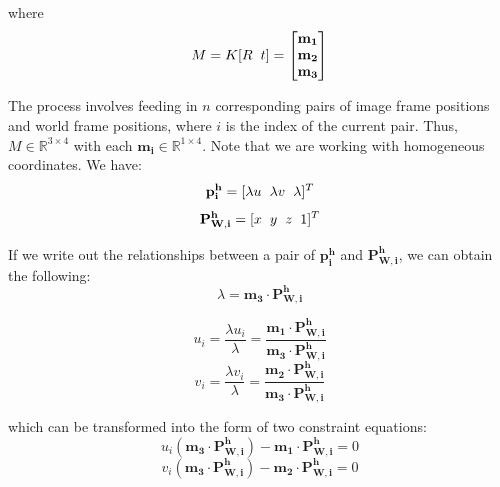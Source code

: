 \documentclass[]{article}
\begin{document}
where
\begin{equation}
    M = K [R \hspace{2mm} t]=
\begin{bmatrix}
    \mathbf{m_1} \\
    \mathbf{m_2} \\
    \mathbf{m_3}
\end{bmatrix}
\end{equation}

The process involves feeding in $n$ corresponding pairs of image frame positions and world frame positions, where $i$ is the index of the current pair. Thus, $M \in \mathbb{R}^{3 \times 4}$ with each $\mathbf{m_i} \in \mathbb{R}^{1 \times 4}$. Note that we are working with homogeneous coordinates. We have:
\begin{equation}
    \mathbf{p_i^h} = [\lambda u \hspace{2mm} \lambda v \hspace{2mm} \lambda]^T
\end{equation}
\begin{equation}
        \mathbf{P_{W,i}^{h}} = [x \hspace{2mm} y \hspace{2mm} z \hspace{2mm} 1]^T
\end{equation}

If we write out the relationships between a pair of $\mathbf{p_i^h}$ and $\mathbf{P_{W,i}^h}$, we can obtain the following:
\begin{equation}
    \lambda = \mathbf{m_3} \cdot \mathbf{P_{W,i}^h}
\end{equation}

\begin{equation}
    u_i = \frac{\lambda u_i}{\lambda} = \frac{\mathbf{m_1} \cdot \mathbf{P_{W,i}^h}}{\mathbf{m_3} \cdot \mathbf{P_{W,i}^h}}
\end{equation}
\begin{equation}
    v_i = \frac{\lambda v_i}{\lambda} = \frac{\mathbf{m_2} \cdot \mathbf{P_{W,i}^h}}{\mathbf{m_3} \cdot \mathbf{P_{W,i}^h}}
\end{equation}

which can be transformed into the form of two constraint equations:
\begin{equation}\label{eqn:u_contraint}
    u_i(\mathbf{m_3} \cdot \mathbf{P_{W,i}^h}) - \mathbf{m_1} \cdot \mathbf{P_{W,i}^h} = 0
\end{equation}
\begin{equation}
    v_i(\mathbf{m_3} \cdot \mathbf{P_{W,i}^h}) - \mathbf{m_2} \cdot \mathbf{P_{W,i}^h} = 0
\end{equation}
\end{document}
